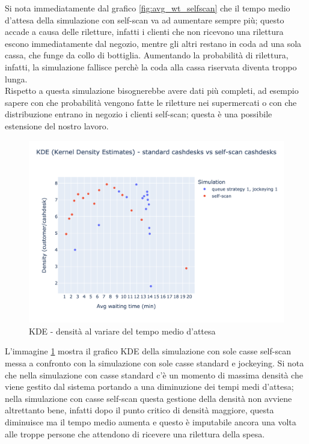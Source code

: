 Si nota immediatamente dal grafico \ref{fig:avg_wt_selfscan} che il tempo medio d'attesa della simulazione con self-scan va ad aumentare sempre più; questo accade a causa delle riletture, infatti i clienti che non ricevono una rilettura escono immediatamente dal negozio, mentre gli altri restano in coda ad una sola cassa, che funge da collo di bottiglia. Aumentando la probabilità di rilettura, infatti, la simulazione fallisce perchè la coda alla cassa riservata diventa troppo lunga. \\
Rispetto a questa simulazione bisognerebbe avere dati più completi, ad esempio sapere con che probabilità vengono fatte le riletture nei supermercati o con che distribuzione entrano in negozio i clienti self-scan; questa è una possibile estensione del nostro lavoro.

\begin{figure}[H]
	\centering
	\includegraphics[width=12cm]{"images/results/kde_self_scan.png"}
	
	\caption{KDE - densità al variare del tempo medio d'attesa}
	\label{fig:kde_self_scan}
\end{figure}

L'immagine \ref{fig:kde_self_scan} mostra il grafico KDE della
simulazione con sole casse self-scan messa a confronto con la
simulazione con sole casse standard e jockeying. Si nota che nella
simulazione con casse standard c'è un momento di massima densità che
viene gestito dal sistema portando a una diminuzione dei tempi medi
d'attesa; nella simulazione con casse self-scan questa gestione della
densità non avviene altrettanto bene, infatti dopo il punto critico di
densità maggiore, questa diminuisce ma il tempo medio aumenta e questo
è imputabile ancora una volta alle troppe persone che attendono di
ricevere una rilettura della spesa.

